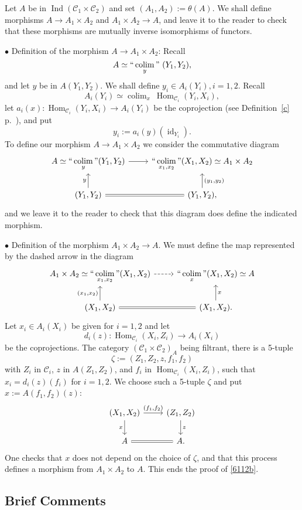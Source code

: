 \documentclass[12pt]{article}%
\theoremstyle{remark}
\theoremstyle{definition}
\newcommand{\bu}{\bullet}
\newcommand{\nn}{\noindent}
\newcommand{\C}{\mathcal C}
\DeclareMathOperator*{\colim}{colim}
\DeclareMathOperator*{\ic}{``\colim"}
\DeclareMathOperator{\id}{id}
\DeclareMathOperator{\Hom}{Hom}%
\DeclareMathOperator{\Ind}{Ind}
\begin{document}
Let $A$ be in $\Ind(\C_1\times\C_2)$ and set $(A_1,A_2):=\theta(A)$. We shall define morphisms $A\to A_1\times A_2$ and $A_1\times A_2\to A$, and leave it to the reader to check that these morphisms are mutually inverse isomorphisms of functors. 

\nn$\bu$ Definition of the morphism $A\to A_1\times A_2$: Recall 
$$
A\simeq\ic_y\ (Y_1,Y_2), 
$$ 
and let $y$ be in $A(Y_1,Y_2)$. We shall define $y_i\in A_i(Y_i),i=1,2$. Recall 
$$
A_i(Y_i)\simeq\colim_x\ \Hom_{\C_i}(Y_i,X_i), 
$$ 
let $a_i(x):\Hom_{\C_i}(Y_i,X_i)\to A_i(Y_i)$ be the coprojection (see Definition~\ref{c} p.~\pageref{c}), and put 
$$
y_i:=a_i(y)(\id_{Y_i}). 
$$ 
To define our morphism $A\to A_1\times A_2$ we consider the commutative diagram
$$
\begin{tikzcd}
A\simeq\displaystyle\ic_y(Y_1,Y_2)\ar{r}&\displaystyle\ic_{x_1,x_2}(X_1,X_2)\simeq A_1\times A_2\\ 
(Y_1,Y_2)\ar{u}{y}\ar[equal]{r}&(Y_1,Y_2),\ar{u}[swap]{(y_1,y_2)}
\end{tikzcd}
$$ 
and we leave it to the reader to check that this diagram does define the indicated morphism.

\nn$\bu$ Definition of the morphism $A_1\times A_2\to A$. We must define the map represented by the dashed arrow in the diagram  
$$
\begin{tikzcd}
A_1\times A_2\simeq\displaystyle\ic_{x_1,x_2}(X_1,X_2)\ar[dashed]{r}&\displaystyle\ic_x(X_1,X_2)\simeq A\\ 
(X_1,X_2)\ar{u}{(x_1,x_2)}\ar[equal]{r}&(X_1,X_2).\ar{u}[swap]{x}
\end{tikzcd}
$$ 
Let $x_i\in A_i(X_i)$ be given for $i=1,2$ and let
$$
d_i(z):\Hom_{\C_i}(X_i,Z_i)\to A_i(X_i)
$$
be the coprojections. The category $(\C_1\times\C_2)_A$ being filtrant, there is a 5-tuple 
$$
\zeta:=(Z_1,Z_2,z,f_1,f_2)
$$ 
with $Z_i$ in $\C_i$, $z$ in $A(Z_1,Z_2)$, and $f_i$ in $\Hom_{\C_i}(X_i,Z_i)$, such that $x_i=d_i(z)(f_i)$ for $i=1,2$. We choose such a 5-tuple $\zeta$ and put $x:=A(f_1,f_2)(z)$:
$$
\begin{tikzcd}
(X_1,X_2)\ar{d}[swap]{x}\ar{r}{(f_1,f_2)}&(Z_1,Z_2)\ar{d}{z}\\ 
A\ar[equal]{r}&A.
\end{tikzcd}
$$ 
One checks that $x$ does not depend on the choice of $\zeta$, and that this process defines a morphism from $A_1\times A_2$ to $A$. This ends the proof of \eqref{6112b}.


\subsection{Brief Comments}
\end{document}
